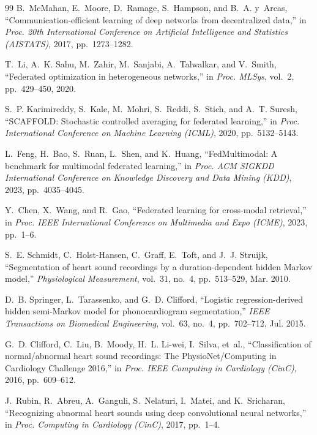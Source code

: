 \documentclass[12pt,a4paper]{amritareport}
\begin{document}
\begin{thebibliography}{99}
B.~McMahan, E.~Moore, D.~Ramage, S.~Hampson, and B.~A. y~Arcas,
``Communication-efficient learning of deep networks from decentralized data,''
in \textit{Proc. 20th International Conference on Artificial Intelligence and Statistics (AISTATS)}, 2017, pp.~1273--1282.

T.~Li, A.~K. Sahu, M.~Zahir, M.~Sanjabi, A.~Talwalkar, and V.~Smith,
``Federated optimization in heterogeneous networks,''
in \textit{Proc. MLSys}, vol.~2, pp.~429--450, 2020.

S.~P. Karimireddy, S.~Kale, M.~Mohri, S.~Reddi, S.~Stich, and A.~T. Suresh,
``SCAFFOLD: Stochastic controlled averaging for federated learning,''
in \textit{Proc. International Conference on Machine Learning (ICML)}, 2020, pp.~5132--5143.

L.~Feng, H.~Bao, S.~Ruan, L.~Shen, and K.~Huang,
``FedMultimodal: A benchmark for multimodal federated learning,''
in \textit{Proc. ACM SIGKDD International Conference on Knowledge Discovery and Data Mining (KDD)}, 2023, pp.~4035--4045.

Y.~Chen, X.~Wang, and R.~Gao,
``Federated learning for cross-modal retrieval,''
in \textit{Proc. IEEE International Conference on Multimedia and Expo (ICME)}, 2023, pp.~1--6.

S.~E. Schmidt, C.~Holst-Hansen, C.~Graff, E.~Toft, and J.~J. Struijk,
``Segmentation of heart sound recordings by a duration-dependent hidden Markov model,''
\textit{Physiological Measurement}, vol.~31, no.~4, pp.~513--529, Mar. 2010.

D.~B. Springer, L.~Tarassenko, and G.~D. Clifford,
``Logistic regression-derived hidden semi-Markov model for phonocardiogram segmentation,''
\textit{IEEE Transactions on Biomedical Engineering}, vol.~63, no.~4, pp.~702--712, Jul. 2015.

G.~D. Clifford, C.~Liu, B.~Moody, H.~L. Li-wei, I.~Silva, et~al.,
``Classification of normal/abnormal heart sound recordings: The PhysioNet/Computing in Cardiology Challenge 2016,''
in \textit{Proc. IEEE Computing in Cardiology (CinC)}, 2016, pp.~609--612.

J.~Rubin, R.~Abreu, A.~Ganguli, S.~Nelaturi, I.~Matei, and K.~Sricharan,
``Recognizing abnormal heart sounds using deep convolutional neural networks,''
in \textit{Proc. Computing in Cardiology (CinC)}, 2017, pp.~1--4.


\end{thebibliography}
\end{document}
